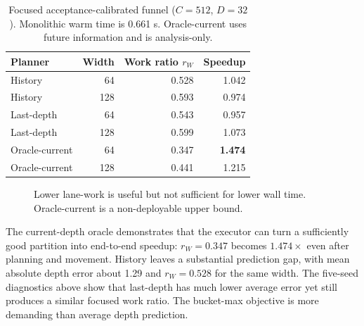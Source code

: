 \documentclass[conference]{IEEEtran}
\begin{document}
\begin{table}[t]
\centering
\caption{Focused acceptance-calibrated funnel ($C=512$, $D=32$).  Monolithic
warm time is 0.661 s.  Oracle-current uses future information and is
analysis-only.}
\label{tab:oracle-gap}
\small
\begin{tabular}{lrrr}
\toprule
Planner & Width & Work ratio $r_W$ & Speedup \\
\midrule
History & 64 & 0.528 & 1.042 \\
History & 128 & 0.593 & 0.974 \\
Last-depth & 64 & 0.543 & 0.957 \\
Last-depth & 128 & 0.599 & 1.073 \\
Oracle-current & 64 & 0.347 & \textbf{1.474} \\
Oracle-current & 128 & 0.441 & 1.215 \\
\bottomrule
\end{tabular}
\end{table}

\begin{figure}[t]
\centering
{}
\caption{Lower lane-work is useful but not sufficient for lower wall time.
Oracle-current is a non-deployable upper bound.}
\label{fig:oracle-gap}
\end{figure}

The current-depth oracle demonstrates that the executor can turn a sufficiently
good partition into end-to-end speedup: $r_W=0.347$ becomes $1.474\times$ even
after planning and movement.  History leaves a substantial prediction gap,
with mean absolute depth error about 1.29 and $r_W=0.528$ for the same width.
The five-seed diagnostics above show that last-depth has much lower average
error yet still produces a similar focused work ratio.  The bucket-max objective
is more demanding than average depth prediction.
\end{document}
